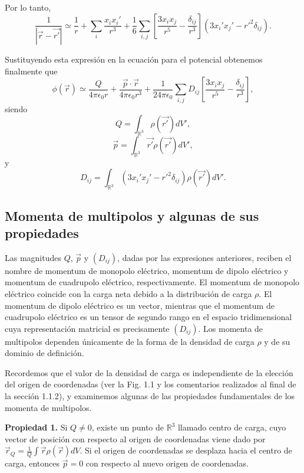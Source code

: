 \documentclass[12pt,a4paper]{book}
\begin{document}
Por lo tanto,
\begin{equation}
\frac{1}{|\vec{r} - \vec{r'}|} \simeq \frac{1}{r} + \sum_{i}\frac{x_i x_i'}{r^3} + \frac{1}{6}\sum_{i,j}\left[\frac{3x_i x_j}{r^5} - \frac{\delta_{ij}}{r^3}\right](3x_i'x_j' - r'^2\delta_{ij}).
\end{equation}

Sustituyendo esta expresión en la ecuación para el potencial obtenemos finalmente que
\begin{equation}
\phi(\vec{r}) \simeq \frac{Q}{4\pi\epsilon_0 r} + \frac{\vec{p}\cdot\vec{r}}{4\pi\epsilon_0 r^3} + \frac{1}{24\pi\epsilon_0}\sum_{i,j}D_{ij}\left[\frac{3x_i x_j}{r^5} - \frac{\delta_{ij}}{r^3}\right],
\end{equation}
siendo
\begin{equation}
Q = \int_{\mathbb{R}^3}\rho(\vec{r'})dV',
\end{equation}
\begin{equation}
\vec{p} = \int_{\mathbb{R}^3}\vec{r'}\rho(\vec{r'})dV',
\end{equation}
y
\begin{equation}
D_{ij} = \int_{\mathbb{R}^3}(3x_i'x_j' - r'^2\delta_{ij})\rho(\vec{r'})dV'.
\end{equation}

\subsection{Momenta de multipolos y algunas de sus propiedades}

Las magnitudes $Q$, $\vec{p}$ y $(D_{ij})$, dadas por las expresiones anteriores, reciben el nombre de momentum de monopolo eléctrico, momentum de dipolo eléctrico y momentum de cuadrupolo eléctrico, respectivamente. El momentum de monopolo eléctrico coincide con la carga neta debido a la distribución de carga $\rho$. El momentum de dipolo eléctrico es un vector, mientras que el momentum de cuadrupolo eléctrico es un tensor de segundo rango en el espacio tridimensional cuya representación matricial es precisamente $(D_{ij})$. Los momenta de multipolos dependen únicamente de la forma de la densidad de carga $\rho$ y de su dominio de definición.

Recordemos que el valor de la densidad de carga es independiente de la elección del origen de coordenadas (ver la Fig. 1.1 y los comentarios realizados al final de la sección 1.1.2), y examinemos algunas de las propiedades fundamentales de los momenta de multipolos.

\textbf{Propiedad 1.} Si $Q \neq 0$, existe un punto de $\mathbb{R}^3$ llamado centro de carga, cuyo vector de posición con respecto al origen de coordenadas viene dado por $\vec{r}_Q = \frac{1}{Q}\int\vec{r}\rho(\vec{r})dV$. Si el origen de coordenadas se desplaza hacia el centro de carga, entonces $\vec{p} = 0$ con respecto al nuevo origen de coordenadas.
\end{document}
